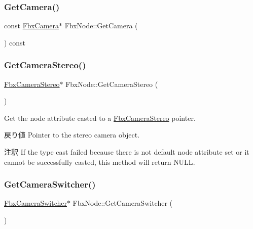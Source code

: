 \subsubsection{\texorpdfstring{Get\+Camera()}{GetCamera()}\hspace{0.1cm}{\footnotesize\ttfamily [2/2]}}
{\footnotesize\ttfamily const \hyperlink{class_fbx_camera}{Fbx\+Camera}$\ast$ Fbx\+Node\+::\+Get\+Camera (\begin{DoxyParamCaption}{ }\end{DoxyParamCaption}) const}

\mbox{\label{class_fbx_node_abcf4721e24b4bad01932342ff62778b5}} 
\subsubsection{\texorpdfstring{Get\+Camera\+Stereo()}{GetCameraStereo()}}
{\footnotesize\ttfamily \hyperlink{class_fbx_camera_stereo}{Fbx\+Camera\+Stereo}$\ast$ Fbx\+Node\+::\+Get\+Camera\+Stereo (\begin{DoxyParamCaption}{ }\end{DoxyParamCaption})}

Get the node attribute casted to a \hyperlink{class_fbx_camera_stereo}{Fbx\+Camera\+Stereo} pointer. \begin{DoxyReturn}{戻り値}
Pointer to the stereo camera object. 
\end{DoxyReturn}
\begin{DoxyRemark}{注釈}
If the type cast failed because there is not default node attribute set or it cannot be successfully casted, this method will return {\ttfamily N\+U\+LL}. 
\end{DoxyRemark}
\mbox{\label{class_fbx_node_a24f4e1fcaba56ddb71276a787c7cbb6f}} 
\subsubsection{\texorpdfstring{Get\+Camera\+Switcher()}{GetCameraSwitcher()}}
{\footnotesize\ttfamily \hyperlink{class_fbx_camera_switcher}{Fbx\+Camera\+Switcher}$\ast$ Fbx\+Node\+::\+Get\+Camera\+Switcher (\begin{DoxyParamCaption}{ }\end{DoxyParamCaption})}

